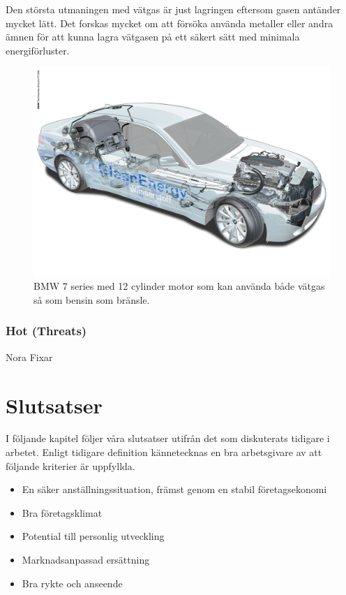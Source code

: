 \documentclass[10pt,a4paper]{article}
\begin{document}
Den största utmaningen med vätgas är just lagringen eftersom gasen antänder mycket lätt. Det forskas mycket om att försöka använda metaller eller andra ämnen för att kunna lagra vätgasen på ett säkert sätt med minimala energiförluster.

\begin{figure}[H] 
\centerline{\includegraphics[scale=0.14]{Bilder/bmwcar.jpg}}
\caption{BMW 7 series med 12 cylinder motor som kan använda både vätgas så som bensin som bränsle.}
\label{fig:bmw}
\end{figure}







\subsubsection{Hot (Threats)}
Nora Fixar


\section{Slutsatser}
I följande kapitel följer våra slutsatser utifrån det som diskuterats tidigare i
arbetet. Enligt tidigare definition kännetecknas en bra arbetsgivare av att 
följande kriterier är uppfyllda.

\begin{itemize}
 \item En säker anställningssituation, främst genom en stabil företagsekonomi 
 \item Bra företagsklimat
 \item Potential till personlig utveckling
 \item Marknadsanpassad ersättning
 \item Bra rykte och anseende
\end{itemize}
\end{document}
